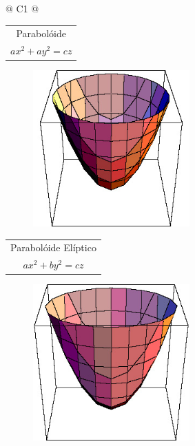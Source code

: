 \begin{longtable}{
		@{}
		C{1\textwidth} 
		@{}}
\begin{tabular}[c]{@{}c@{}}
				{\large Parabolóide} \\

				{\large $ax^{2} + ay^{2} = cz$}\\

            \end{tabular}

			\begin{figure}[H]
			    \centering
				\includegraphics[height=6cm]{images/ufmg_figura-1-6}
			\end{figure}
			\tabularnewline
			\midrule
			\begin{tabular}[c]{@{}c@{}} 

				{\large Parabolóide Elíptico} \\

				{\large $ax^{2} + by^{2} = cz$}\\

            \end{tabular}

			\begin{figure}[H]
			    \centering
				\includegraphics[height=6cm]{images/ufmg_figura-1-7}
			\end{figure}
			\tabularnewline
			\midrule
			\begin{tabular}[c]{@{}c@{}} 


\end{tabular}
\end{longtable}
